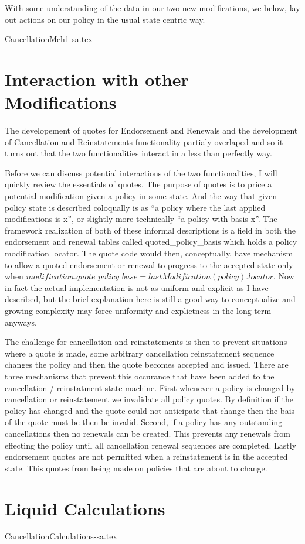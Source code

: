 With some understanding of the data in our two new modifications, we below, lay out actions on our policy in the usual
state centric way. 

{CancellationMch1-sa.tex}

\section{Interaction with other Modifications}
The developement of quotes for Endorsement and Renewals and the development of Cancellation and Reinstatements functionality
partialy overlaped and so it turns out that the two functionalities interact in a less than perfectly way.

Before we can discuss potential interactions of the two functionalities, I will quickly review the essentials of quotes. The
purpose of quotes is to price a potential modification given a policy in some state. And the way that given policy state is described
coloqually is as ``a policy where the last applied modifications is x'', or slightly more technically ``a policy with basis x''. The
framework realization of both of these informal descriptions is a field in both the endorsement and
renewal tables called quoted\_policy\_basis which holds a policy modification locator. The quote code would then, conceptually, have
mechanism to allow a quoted endorsement or renewal to progress to the accepted state only when
$ modification.quote\_policy\_base = lastModification(policy).locator $. Now in
fact the actual implementation is not as uniform and explicit as I have described, but the brief explanation here is still a good way
to conceptualize and growing complexity may force uniformity and explictness in the long term anyways.

The challenge for cancellation and reinstatements is then to prevent situations where a quote is made, some arbitrary cancellation
reinstatement sequence changes the policy and then the quote becomes accepted and issued. There are three mechanisms that
prevent this occurance that have been added to the cancellation / reinstatment state machine. First whenever a policy is
changed by cancellation or reinstatement we invalidate all policy quotes. By definition if the policy has changed and the quote
could not anticipate that change then the bais of the quote must be then be invalid. Second, if a policy has any outstanding
cancellations then no renewals can be created. This prevents any renewals from effecting the policy until all cancellation
renewal sequences are completed. Lastly endorsement quotes are not permitted when a reinstatement is in the accepted state. This
quotes from being made on policies that are about to change.

\section{Liquid Calculations}
\label{sec:02:2}

{CancellationCalculations-sa.tex}
